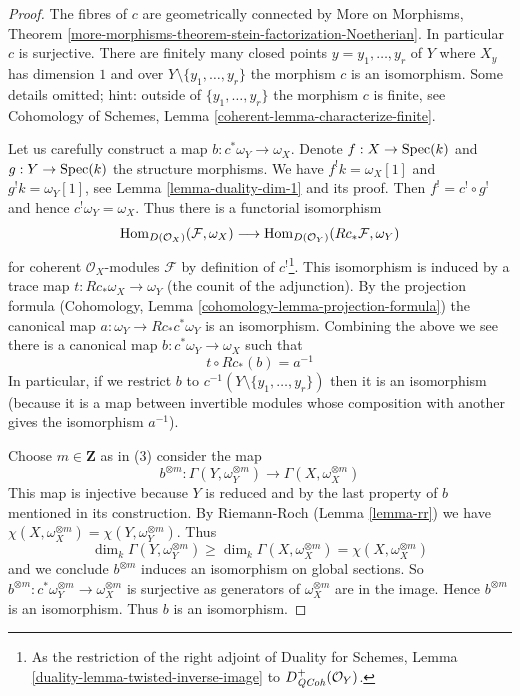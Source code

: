 \begin{proof}
The fibres of $c$ are geometrically connected by
More on Morphisms, Theorem
\ref{more-morphisms-theorem-stein-factorization-Noetherian}.
In particular $c$ is surjective.
There are finitely many closed points $y = y_1, \ldots, y_r$ of $Y$ where
$X_y$ has dimension $1$ and over $Y \setminus \{y_1, \ldots, y_r\}$
the morphism $c$ is an isomorphism.
Some details omitted; hint: outside of $\{y_1, \ldots, y_r\}$
the morphism $c$ is finite, see
Cohomology of Schemes, Lemma \ref{coherent-lemma-characterize-finite}.

\medskip\noindent
Let us carefully construct a map $b : c^*\omega_Y \to \omega_X$.
Denote $f : X \to \mathop{\mathrm{Spec}}(k)$ and $g : Y \to \mathop{\mathrm{Spec}}(k)$ the structure
morphisms. We have $f^!k = \omega_X[1]$ and $g^!k = \omega_Y[1]$, see
Lemma \ref{lemma-duality-dim-1} and its proof. Then
$f^! = c^! \circ g^!$ and hence $c^!\omega_Y = \omega_X$.
Thus there is a functorial isomorphism
$$
\mathop{\mathrm{Hom}}\nolimits_{D(\mathcal{O}_X)}(\mathcal{F}, \omega_X)
\longrightarrow
\mathop{\mathrm{Hom}}\nolimits_{D(\mathcal{O}_Y)}(Rc_*\mathcal{F}, \omega_Y)
$$
for coherent $\mathcal{O}_X$-modules $\mathcal{F}$ by definition
of $c^!$\footnote{As the restriction of the right adjoint of
Duality for Schemes, Lemma \ref{duality-lemma-twisted-inverse-image} to
$D^+_{\mathit{QCoh}}(\mathcal{O}_Y)$.}.
This isomorphism is induced by a trace map $t : Rc_*\omega_X \to \omega_Y$
(the counit of the adjunction). By the projection formula
(Cohomology, Lemma \ref{cohomology-lemma-projection-formula})
the canonical map $a : \omega_Y \to Rc_*c^*\omega_Y$ is an isomorphism.
Combining the above we see there is a canonical map
$b : c^*\omega_Y \to \omega_X$ such that
$$
t \circ Rc_*(b) = a^{-1}
$$
In particular, if we restrict $b$ to $c^{-1}(Y \setminus \{y_1, \ldots, y_r\})$
then it is an isomorphism (because it is a map between invertible modules
whose composition with another gives the isomorphism $a^{-1}$).

\medskip\noindent
Choose $m \in \mathbf{Z}$ as in (3) consider the map
$$
b^{\otimes m} :
\Gamma(Y, \omega_Y^{\otimes m})
\longrightarrow
\Gamma(X, \omega_X^{\otimes m})
$$
This map is injective because $Y$ is reduced and by the last
property of $b$ mentioned in its construction.
By Riemann-Roch (Lemma \ref{lemma-rr}) we have
$\chi(X, \omega_X^{\otimes m}) =\chi(Y, \omega_Y^{\otimes m})$.
Thus
$$
\dim_k \Gamma(Y, \omega_Y^{\otimes m}) \geq
\dim_k \Gamma(X, \omega_X^{\otimes m}) = \chi(X, \omega_X^{\otimes m})
$$
and we conclude $b^{\otimes m}$ induces an isomorphism on global
sections. So
$b^{\otimes m} : c^*\omega_Y^{\otimes m} \to \omega_X^{\otimes m}$
is surjective as generators of $\omega_X^{\otimes m}$ are in the image.
Hence $b^{\otimes m}$ is an isomorphism. Thus $b$ is an isomorphism.
\end{proof}

